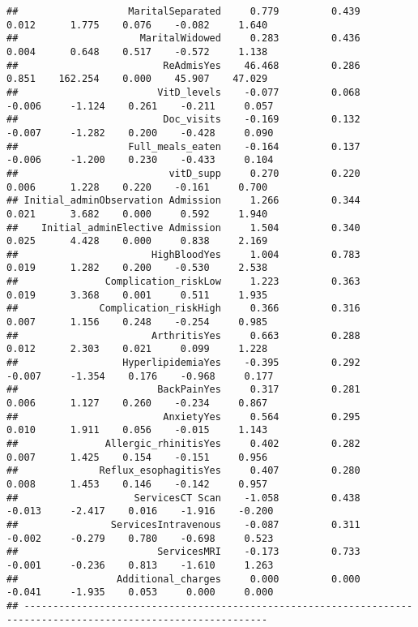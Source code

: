 \documentclass[
]{article}
\begin{document}
\begin{verbatim}
##                   MaritalSeparated     0.779         0.439        0.012      1.775    0.076    -0.082     1.640 
##                     MaritalWidowed     0.283         0.436        0.004      0.648    0.517    -0.572     1.138 
##                         ReAdmisYes    46.468         0.286        0.851    162.254    0.000    45.907    47.029 
##                        VitD_levels    -0.077         0.068       -0.006     -1.124    0.261    -0.211     0.057 
##                         Doc_visits    -0.169         0.132       -0.007     -1.282    0.200    -0.428     0.090 
##                   Full_meals_eaten    -0.164         0.137       -0.006     -1.200    0.230    -0.433     0.104 
##                          vitD_supp     0.270         0.220        0.006      1.228    0.220    -0.161     0.700 
## Initial_adminObservation Admission     1.266         0.344        0.021      3.682    0.000     0.592     1.940 
##    Initial_adminElective Admission     1.504         0.340        0.025      4.428    0.000     0.838     2.169 
##                       HighBloodYes     1.004         0.783        0.019      1.282    0.200    -0.530     2.538 
##               Complication_riskLow     1.223         0.363        0.019      3.368    0.001     0.511     1.935 
##              Complication_riskHigh     0.366         0.316        0.007      1.156    0.248    -0.254     0.985 
##                       ArthritisYes     0.663         0.288        0.012      2.303    0.021     0.099     1.228 
##                  HyperlipidemiaYes    -0.395         0.292       -0.007     -1.354    0.176    -0.968     0.177 
##                        BackPainYes     0.317         0.281        0.006      1.127    0.260    -0.234     0.867 
##                         AnxietyYes     0.564         0.295        0.010      1.911    0.056    -0.015     1.143 
##               Allergic_rhinitisYes     0.402         0.282        0.007      1.425    0.154    -0.151     0.956 
##              Reflux_esophagitisYes     0.407         0.280        0.008      1.453    0.146    -0.142     0.957 
##                    ServicesCT Scan    -1.058         0.438       -0.013     -2.417    0.016    -1.916    -0.200 
##                ServicesIntravenous    -0.087         0.311       -0.002     -0.279    0.780    -0.698     0.523 
##                        ServicesMRI    -0.173         0.733       -0.001     -0.236    0.813    -1.610     1.263 
##                 Additional_charges     0.000         0.000       -0.041     -1.935    0.053     0.000     0.000 
## ----------------------------------------------------------------------------------------------------------------

\end{verbatim}
\end{document}
